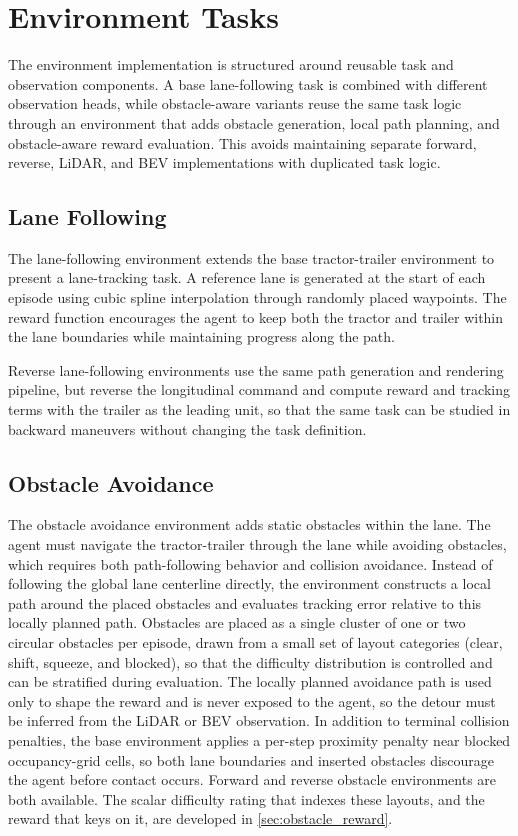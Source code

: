 \section{Environment Tasks}

The environment implementation is structured around reusable task and observation components. A base lane-following task is combined with different observation heads, while obstacle-aware variants reuse the same task logic through an environment that adds obstacle generation, local path planning, and obstacle-aware reward evaluation. This avoids maintaining separate forward, reverse, LiDAR, and BEV implementations with duplicated task logic.

\subsection{Lane Following}

The lane-following environment extends the base tractor-trailer environment to present a lane-tracking task. A reference lane is generated at the start of each episode using cubic spline interpolation through randomly placed waypoints. The reward function encourages the agent to keep both the tractor and trailer within the lane boundaries while maintaining progress along the path.

Reverse lane-following environments use the same path generation and rendering pipeline, but reverse the longitudinal command and compute reward and tracking terms with the trailer as the leading unit, so that the same task can be studied in backward maneuvers without changing the task definition.

\subsection{Obstacle Avoidance}

The obstacle avoidance environment adds static obstacles within the lane. The agent must navigate the tractor-trailer through the lane while avoiding obstacles, which requires both path-following behavior and collision avoidance. Instead of following the global lane centerline directly, the environment constructs a local path around the placed obstacles and evaluates tracking error relative to this locally planned path. Obstacles are placed as a single cluster of one or two circular obstacles per episode, drawn from a small set of layout categories (clear, shift, squeeze, and blocked), so that the difficulty distribution is controlled and can be stratified during evaluation. The locally planned avoidance path is used only to shape the reward and is never exposed to the agent, so the detour must be inferred from the LiDAR or BEV observation. In addition to terminal collision penalties, the base environment applies a per-step proximity penalty near blocked occupancy-grid cells, so both lane boundaries and inserted obstacles discourage the agent before contact occurs. Forward and reverse obstacle environments are both available. The scalar difficulty rating that indexes these layouts, and the reward that keys on it, are developed in \cref{sec:obstacle_reward}.


